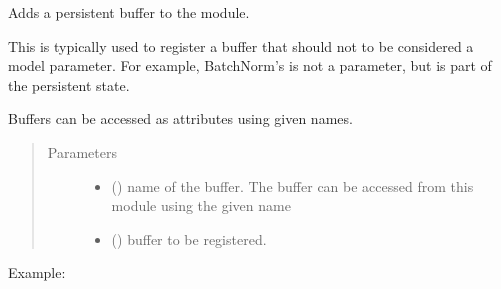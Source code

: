 \documentclass[letterpaper,10pt,english]{sphinxmanual}
\begin{document}
\begin{fulllineitems}
\begin{fulllineitems}
\end{fulllineitems}


\begin{fulllineitems}
\label{\detokenize{api/autoencoding:geology.metamodelling.SpatialAutoencoder.register_buffer}}
Adds a persistent buffer to the module.

This is typically used to register a buffer that should not to be
considered a model parameter. For example, BatchNorm’s 
is not a parameter, but is part of the persistent state.

Buffers can be accessed as attributes using given names.
\begin{quote}\begin{description}
\item[{Parameters}] \leavevmode\begin{itemize}
\item {} 
 () \textendash{} name of the buffer. The buffer can be accessed
from this module using the given name

\item {} 
 () \textendash{} buffer to be registered.

\end{itemize}

\end{description}\end{quote}

Example:

\begin{sphinxVerbatim}[commandchars=\\\{\}]
 
\end{sphinxVerbatim}

\end{fulllineitems}


\end{fulllineitems}
\end{document}
